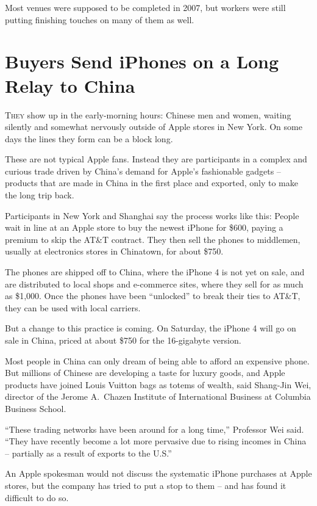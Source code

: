 ﻿\documentclass[12pt]{article}
\begin{document}
Most venues were supposed to be completed in 2007, but workers were still putting finishing touches
on many of them as well.

\pagebreak
\section{Buyers Send iPhones on a Long Relay to China}

\lettrine{T}{hey} show up in the early-morning hours: Chinese men and
women, waiting silently and somewhat nervously outside of Apple stores in New York. On some days the
lines they form can be a block long.

These are not typical Apple fans. Instead they are participants in a complex and curious trade
driven by China's demand for Apple's fashionable gadgets -- products that are made in China in the
first place and exported, only to make the long trip back.

Participants in New York and Shanghai say the process works like this: People wait in line at an
Apple store to buy the newest iPhone for \$600, paying a premium to skip the AT\&T contract. They
then sell the phones to middlemen, usually at electronics stores in Chinatown, for about \$750.

The phones are shipped off to China, where the iPhone 4 is not yet on sale, and are distributed to
local shops and e-commerce sites, where they sell for as much as \$1,000. Once the phones have been
``unlocked'' to break their ties to AT\&T, they can be used with local carriers.

But a change to this practice is coming. On Saturday, the iPhone 4 will go on sale in China, priced
at about \$750 for the 16-gigabyte version.

Most people in China can only dream of being able to afford an expensive phone. But millions of
Chinese are developing a taste for luxury goods, and Apple products have joined Louis Vuitton bags
as totems of wealth, said Shang-Jin Wei, director of the Jerome A.~Chazen Institute of International
Business at Columbia Business School.

``These trading networks have been around for a long time,'' Professor Wei said. ``They have
recently become a lot more pervasive due to rising incomes in China -- partially as a result of
exports to the U.S.''

An Apple spokesman would not discuss the systematic iPhone purchases at Apple stores, but the
company has tried to put a stop to them -- and has found it difficult to do so.
\end{document}
